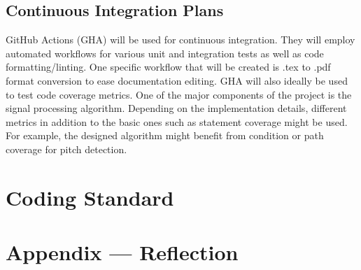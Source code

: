 \documentclass{article}
\begin{document}
\subsection{Continuous Integration Plans}
GitHub Actions (GHA) will be used for continuous integration. They will employ automated workflows for various unit and integration tests
as well as code formatting/linting. One specific workflow that will be created is .tex to .pdf format conversion to ease documentation editing.
GHA will also ideally be used to test code coverage metrics. One of the major components of the project is the signal processing algorithm.  
Depending on the implementation details, different metrics in addition to the basic ones such as statement coverage might be used. For example, the designed algorithm 
might benefit from condition or path coverage for pitch detection.

\section{Coding Standard}


\newpage{}

\section*{Appendix --- Reflection}


\end{document}
